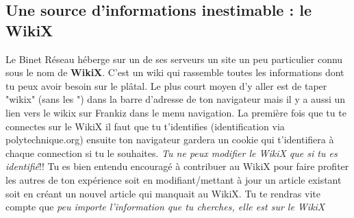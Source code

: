 
\newline
\subsection{Une source d'informations inestimable : le WikiX}
\label{WikiX}

Le Binet R\'eseau h\'eberge sur un de ses serveurs un site un peu particulier connu sous le nom de \textbf{WikiX}. C'est un wiki qui rassemble toutes les informations
dont tu peux avoir besoin sur le pl\^atal. Le plus court moyen d'y aller est de taper "wikix" (sans les ") dans la barre d'adresse de ton navigateur mais il y
a aussi un lien vers le wikix sur Frankiz dans le menu navigation.
\newline
\newline
La premi\`ere fois que tu te connectes sur le WikiX il faut que tu t'identifies (identification via polytechnique.org) ensuite ton navigateur gardera un cookie
qui t'identifiera \`a chaque connection si tu le souhaites. \emph{Tu ne peux modifier le WikiX que si tu es identifi\'e}!!
\newline
\newline
Tu es bien entendu encourag\'e \`a contribuer au WikiX pour faire profiter les autres de ton exp\'erience
soit en modifiant/mettant \`a jour un article existant soit en cr\'eant un nouvel article qui manquait au WikiX.
\newline
\newline
Tu te rendras vite compte que \emph{peu importe l'information que tu cherches, elle est sur le WikiX}